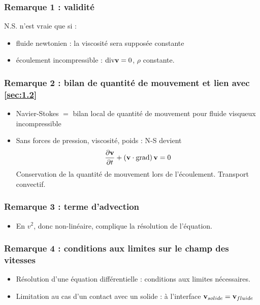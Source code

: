 \documentclass[11pt,a4paper]{report}
\begin{document}
\subsubsection{Remarque 1 : validité}
N.S. n'est vraie que si :
\begin{itemize}
	\item fluide newtonien : la viscosité sera supposée constante
	\item écoulement incompressible : $\text{div}\bold{v} = 0$, $\rho$ constante.\\
\end{itemize}

\subsubsection{Remarque 2 : bilan de quantité de mouvement et lien avec \ref{sec:1.2}}
\begin{itemize}
	\item Navier-Stokes $=$ bilan local de quantité de mouvement pour fluide visqueux incompressible
	\item Sans forces de pression, viscosité, poids : N-S devient
	\begin{equation}
		\frac{\partial\bold{v}}{\partial t} + \left(\bold{v}\cdot\bold{\text{grad}}\right)\bold{v}= 0
	\end{equation}
	Conservation de la quantité de mouvement lors de l'écoulement. Transport convectif.
\end{itemize}

\subsubsection{Remarque 3 : terme d'advection}
\begin{itemize}
	\item En $v^2$, donc non-linéaire, complique la résolution de l'équation.\\
\end{itemize}

\subsubsection{Remarque 4 : conditions aux limites sur le champ des vitesses}
\begin{itemize}
	\item Résolution d'une équation différentielle : conditions aux limites nécessaires.
	\item Limitation au cas d'un contact avec un solide : à l'interface \textcolor{red}{$\bold{v}_{solide} = \bold{v}_{fluide}$}\\
\end{itemize}
\end{document}
